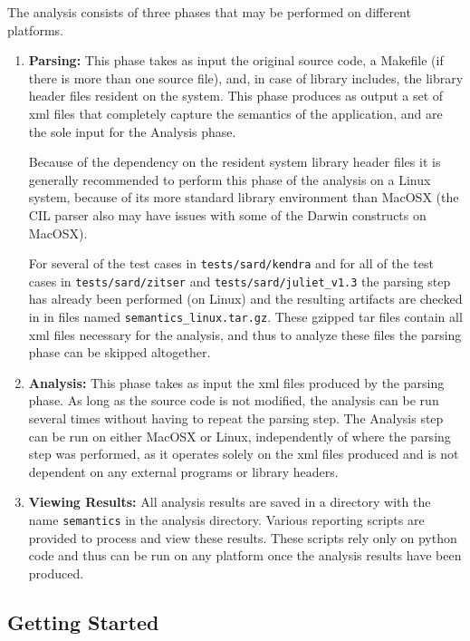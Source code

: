 \documentclass[11pt]{article}
\begin{document}
The analysis consists of three phases that may be performed on different platforms.
\begin{enumerate}
\item {\bf Parsing:} This phase takes as input the original source code, a Makefile 
  (if there is more than one source file), and, in case of library includes, the 
  library header files resident on the system. This phase produces as output a set 
  of xml files that completely capture the semantics of the application, and are 
  the sole input for the Analysis phase.

  Because of the dependency on the resident system library header files it is 
  generally recommended to perform this phase of the analysis on a Linux system, 
  because of its more standard library environment than MacOSX (the CIL parser 
  also may have issues with some of the Darwin constructs on MacOSX).
  
  For several of the test cases in {\tt tests/sard/kendra} and for all of the test cases 
  in {\tt tests/sard/zitser} and {\tt tests/sard/juliet\_v1.3} the parsing step has 
  already been performed (on Linux) 
  and the resulting artifacts are checked in in files named {\tt semantics\_linux.tar.gz}. These 
  gzipped tar files contain all xml files necessary for the analysis, and thus 
  to analyze these files the parsing phase can be skipped altogether.
  
\item {\bf Analysis:} This phase takes as input the xml files produced by the parsing 
  phase. As long as the source code is not modified, the analysis can be run several 
  times without having to repeat the parsing step. The Analysis step can be run on 
  either MacOSX or Linux, independently of where the parsing step was performed, as 
  it operates solely on the xml files produced and is not dependent on any external 
  programs or library headers.
  
\item {\bf Viewing Results:} All analysis results are saved in a directory with the name
  {\tt semantics} in the analysis directory. Various reporting scripts are provided to
  process and view these results. These scripts rely only on python code and thus can
  be run on any platform once the analysis results have been produced.
\end{enumerate}

\subsection{Getting Started}
\end{document}
